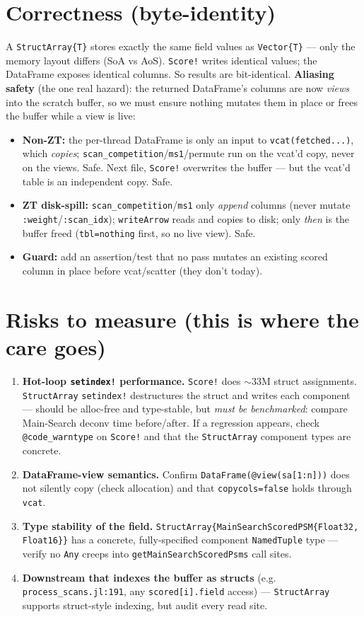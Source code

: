 \documentclass[11pt]{article}
\newcommand{\code}[1]{\texttt{\small #1}}
\begin{document}
\section{Correctness (byte-identity)}
A \code{StructArray\{T\}} stores exactly the same field values as \code{Vector\{T\}} --- only the
memory layout differs (SoA vs AoS). \code{Score!} writes identical values; the DataFrame exposes
identical columns. So results are bit-identical. \textbf{Aliasing safety} (the one real hazard):
the returned DataFrame's columns are now \emph{views} into the scratch buffer, so we must ensure
nothing mutates them in place or frees the buffer while a view is live:
\begin{itemize}[nosep]
  \item \textbf{Non-ZT:} the per-thread DataFrame is only an input to \code{vcat(fetched...)},
    which \emph{copies}; \code{scan\_competition}/\code{ms1}/permute run on the vcat'd copy, never
    on the views. Safe. Next file, \code{Score!} overwrites the buffer --- but the vcat'd table
    is an independent copy. Safe.
  \item \textbf{ZT disk-spill:} \code{scan\_competition}/\code{ms1} only \emph{append} columns
    (never mutate \code{:weight}/\code{:scan\_idx}); \code{writeArrow} reads and copies to disk;
    only \emph{then} is the buffer freed (\code{tbl=nothing} first, so no live view). Safe.
  \item \textbf{Guard:} add an assertion/test that no pass mutates an existing scored column in
    place before vcat/scatter (they don't today).
\end{itemize}

\section{Risks to measure (this is where the care goes)}
\begin{enumerate}[nosep]
  \item \textbf{Hot-loop \code{setindex!} performance.} \code{Score!} does \(\sim\)33M struct
    assignments. \code{StructArray} \code{setindex!} destructures the struct and writes each
    component --- should be alloc-free and type-stable, but \emph{must be benchmarked}: compare
    Main-Search deconv time before/after. If a regression appears, check \code{@code\_warntype}
    on \code{Score!} and that the \code{StructArray} component types are concrete.
  \item \textbf{DataFrame-view semantics.} Confirm \code{DataFrame(@view(sa[1:n]))} does not
    silently copy (check allocation) and that \code{copycols=false} holds through \code{vcat}.
  \item \textbf{Type stability of the field.} \code{StructArray\{MainSearchScoredPSM\{Float32,
    Float16\}\}} has a concrete, fully-specified component \code{NamedTuple} type --- verify no
    \code{Any} creeps into \code{getMainSearchScoredPsms} call sites.
  \item \textbf{Downstream that indexes the buffer as structs} (e.g. \code{process\_scans.jl:191},
    any \code{scored[i].field} access) --- \code{StructArray} supports struct-style indexing, but
    audit every read site.
\end{enumerate}
\end{document}

